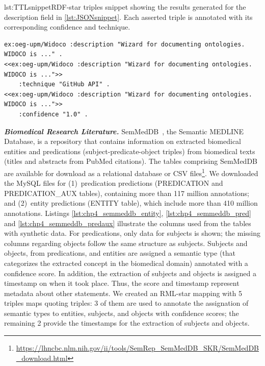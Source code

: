 \begin{captionedlisting}{lst:TTLsnippet}{RDF-star triples snippet showing the results generated for the description field in \cref{lst:JSONsnippet}. Each asserted triple is annotated with its corresponding confidence and technique.}
\centering
{
\begin{lstlisting}[basicstyle=\ttfamily\small,label={list:example1},columns=flexible]
ex:oeg-upm/Widoco :description "Wizard for documenting ontologies. WIDOCO is ..." .
<<ex:oeg-upm/Widoco :description "Wizard for documenting ontologies. WIDOCO is ...">> 
    :technique "GitHub API" .
<<ex:oeg-upm/Widoco :description "Wizard for documenting ontologies. WIDOCO is ...">> 
    :confidence "1.0" .
\end{lstlisting}
}
\end{captionedlisting}




\noindent\textbf{\textit{Biomedical Research Literature.}} 
SemMedDB~\cite{SemMedDB}, the Semantic MEDLINE Database, is a repository 
that contains information on extracted biomedical entities 
and predications (subject-predicate-object triples) 
from biomedical texts (titles and abstracts from PubMed citations). 
The tables comprising SemMedDB are available for download as a relational database or CSV files\footnote{ \url{https://lhncbc.nlm.nih.gov/ii/tools/SemRep_SemMedDB_SKR/SemMedDB_download.html}}.
We downloaded the MySQL files for (1)~predication predictions (PREDICATION and PREDICATION\_AUX tables), containing more than 117 million annotations; and (2)~entity predictions (ENTITY table), which include more than 410 million annotations.
Listings \ref{lst:chp4_semmeddb_entity}, \ref{lst:chp4_semmeddb_pred} and \ref{lst:chp4_semmeddb_predaux} illustrate the columns used from the tables with synthetic data. 
For predications, only data for subjects is shown; the missing columns regarding objects follow the same structure as subjects.
Subjects and objects, from predications, and entities are assigned a semantic type 
(that categorizes the extracted concept in the biomedical domain) annotated with a confidence score. 
In addition, the extraction of subjects and objects is assigned a timestamp on when it took place. 
Thus, the score and timestamp represent metadata about other statements.
We created an RML-star mapping with 5 triples maps quoting triples:
3 of them are used to annotate the assignation of semantic types to entities, subjects, and objects with confidence scores;
the remaining 2 provide the timestamps for the extraction of subjects and objects. 

